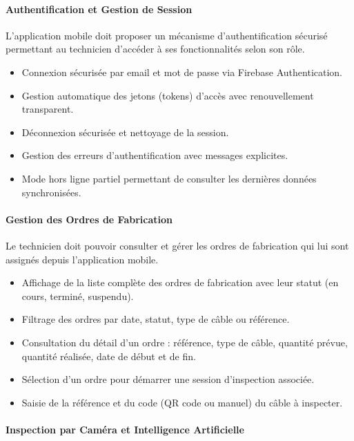 \paragraph{Authentification et Gestion de Session}

L'application mobile doit proposer un mécanisme d'authentification sécurisé permettant au technicien d'accéder à ses fonctionnalités selon son rôle.

\begin{itemize}
    \item Connexion sécurisée par email et mot de passe via Firebase Authentication.
    \item Gestion automatique des jetons (tokens) d'accès avec renouvellement transparent.
    \item Déconnexion sécurisée et nettoyage de la session.
    \item Gestion des erreurs d'authentification avec messages explicites.
    \item Mode hors ligne partiel permettant de consulter les dernières données synchronisées.
\end{itemize}

\paragraph{Gestion des Ordres de Fabrication}

Le technicien doit pouvoir consulter et gérer les ordres de fabrication qui lui sont assignés depuis l'application mobile.

\begin{itemize}
    \item Affichage de la liste complète des ordres de fabrication avec leur statut (en cours, terminé, suspendu).
    \item Filtrage des ordres par date, statut, type de câble ou référence.
    \item Consultation du détail d'un ordre : référence, type de câble, quantité prévue, quantité réalisée, date de début et de fin.
    \item Sélection d'un ordre pour démarrer une session d'inspection associée.
    \item Saisie de la référence et du code (QR code ou manuel) du câble à inspecter.
\end{itemize}

\paragraph{Inspection par Caméra et Intelligence Artificielle}

